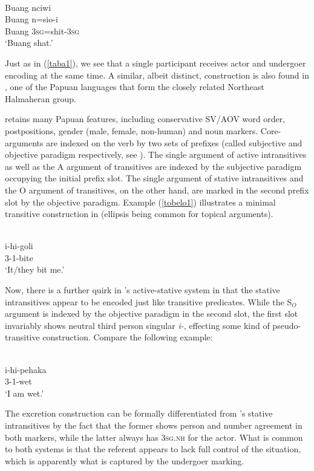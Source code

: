 \ea \label{taba2}
\\
\glll Buang nciwi \\
Buang n=sio-i \\
Buang \textsc{3}\textsc{sg}=shit-\textsc{3}\textsc{sg} \\
\glft `Buang shat.' 
\z

Just as in (\ref{taba1}), we see that a single participant receives actor and undergoer encoding at the same time. A similar, albeit distinct, construction is also found in , one of the Papuan languages that form the closely related Northeast Halmaheran group.

 retains many Papuan features, including conservative SV/AOV word order, postpositions, gender (male, female, non-human) and noun markers. Core-arguments are indexed on the verb by two sets of prefixes (called subjective and objective paradigm respectively, see \citealt[38]{holton2003tobelo}). The single argument of active intransitives as well as the A argument of transitives are indexed by the subjective paradigm occupying the initial prefix slot. The single argument of stative intransitives and the O argument of transitives, on the other hand, are marked in the second prefix slot by the objective paradigm. Example (\ref{tobelo1}) illustrates a minimal transitive construction in  (ellipsis being common for topical arguments).

\ea \label{tobelo1}
\\
\gll i-hi-goli \\
3-1-bite \\
\glft `It/they bit me.' 
\z

Now, there is a further quirk in 's active-stative system in that the stative intransitives appear to be encoded just like transitive predicates. While the S$_O$ argument is indexed by the objective paradigm in the second slot, the first slot invariably shows neutral third person singular \textit{i-}, effecting some kind of pseudo-transitive construction. Compare the following example:

\ea 
{}\\
\gll i-hi-pehaka \\
3-1-wet \\
\glft `I am wet.'
\z

The  excretion construction can be formally differentiated from 's stative intransitives by the fact that the former shows person and number agreement in both markers, while the latter always has \textsc{3sg.nh} for the actor. What is common to both systems is that the referent appears to lack full control of the situation, which is apparently what is captured by the undergoer marking.

